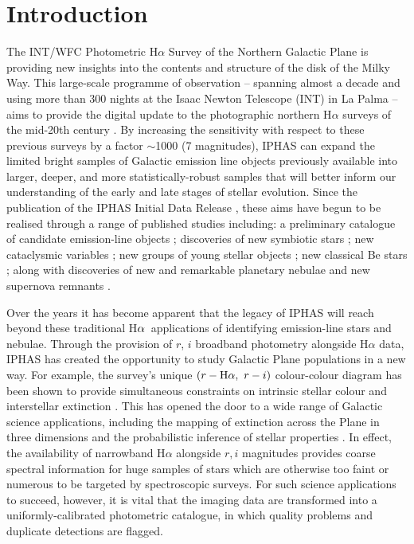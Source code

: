 \documentclass[useAMS,usenatbib]{mn2e}
\def\ha{\mbox{H$\rm \alpha$}}
\begin{document}
\section{Introduction}
The INT/WFC Photometric H$\alpha$ Survey
of the Northern Galactic Plane \citep[IPHAS;][]{Drew2005}
is providing new insights into the contents and structure of the disk of the Milky Way.
This large-scale programme of observation
-- spanning almost a decade 
and using more than 300 nights 
at the Isaac Newton Telescope (INT) in La Palma --
aims to provide the digital update 
to the photographic northern H$\alpha$ surveys 
of the mid-20th century \citep[see][]{Kohoutek1999}. 
By increasing the sensitivity 
with respect to these previous surveys 
by a factor $\sim$1000 (7 magnitudes), 
IPHAS can expand
the limited bright samples of Galactic emission line objects 
previously available into larger, deeper, and more statistically-robust samples that will 
better inform our understanding 
of the early and late stages of stellar evolution.
Since the publication of the IPHAS Initial Data Release \citep[IDR;][]{Gonzalez-Solares2008},
these aims have begun to be realised through a
range of published studies including: 
a preliminary catalogue of candidate emission-line objects \citep{Witham2008};
discoveries of new symbiotic stars \citep{Corradi2008, Corradi2010, Corradi2011}; 
new cataclysmic variables \citep{Witham2007}; 
new groups of young stellar objects
\citep{Vink2008,Barentsen2011a,Wright2012};
new classical Be stars \citep{Raddi2013};
along with discoveries of new and remarkable planetary nebulae 
\citep{Mampaso2006, Viironen2009a, Viironen2009b, Corradi2011, Viironen2011}
and new supernova remnants \citep{Sabin2013}.

Over the years it has become apparent that the legacy of IPHAS 
will reach beyond these traditional \ha\ applications 
of identifying emission-line stars and nebulae. 
Through the provision of $r$, $i$ broadband photometry 
alongside H$\alpha$ data,
IPHAS has created the opportunity 
to study Galactic Plane populations 
in a new way.
For example, the survey’s unique $(r-\ha,\ r-i)$ colour-colour
diagram has been shown to provide simultaneous constraints 
on intrinsic stellar colour and interstellar extinction \citep{Drew2008}. 
This has opened the door 
to a wide range of Galactic science applications, 
including the mapping of extinction across the Plane in three dimensions
and the probabilistic inference of stellar properties
\citep{Sale2009, Sale2010, Giammanco2011, Sale2012, Barentsen2013}. 
In effect, the availability of narrowband H$\alpha$ 
alongside $r, i$ magnitudes
provides coarse spectral information for huge samples of stars 
which are otherwise too faint or numerous 
to be targeted by spectroscopic surveys.
For such science applications to succeed, however, 
it is vital that the imaging data are transformed 
into a uniformly-calibrated photometric catalogue, 
in which quality problems 
and duplicate detections are flagged. 
\end{document}
